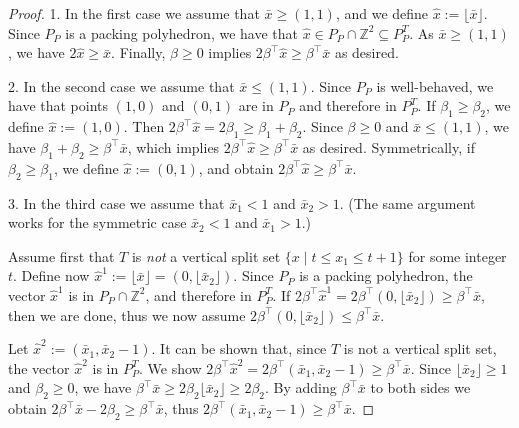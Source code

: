 \documentclass[11pt]{article}
\newcommand{\Z}{\mathbb{Z}}
\newcommand{\floor}[1]{\lfloor#1\rfloor}
\newcommand{\bpar}{\beta}
\newcommand{\cred}{\color{black}}
\begin{document}
\begin{proof}
1. In the first case we assume that $\bar x \ge (1,1)$, and we define $\hat x := \lfloor \bar x \rfloor$.
Since $P_P$ is a packing polyhedron, we have that $\hat x \in P_P \cap \Z^2 \subseteq P_P^T$.
As $\bar x \ge (1,1)$, we have $2 \hat x \ge \bar x$.
Finally, $\bpar \ge 0$ implies $2 \bpar^\top \hat x \ge \bpar^\top \bar x$ as desired.

2. In the second case we assume that $\bar x \le (1,1)$.
Since $P_P$ is well-behaved, we have that points $(1,0)$ and $(0,1)$ are in $P_P$ and therefore in $P_P^T$.
If $\bpar_1 \ge \bpar_2$, we define $\hat x := (1,0)$.
Then $2\bpar^\top \hat x = 2 \bpar_1 \ge \bpar_1 + \bpar_2$.
Since $\bpar \ge 0$ and $\bar x \le (1,1)$, we have $\bpar_1 + \bpar_2 \ge \bpar^\top \bar x$, which implies $2\bpar^\top \hat x \ge \bpar^\top \bar x$ as desired.
Symmetrically, if $\bpar_2 \ge \bpar_1$, we define $\hat x := (0,1)$, and obtain $2\bpar^\top \hat x \ge \bpar^\top \bar x$.

3. In the third case we assume that $\bar x_1 < 1$ and $\bar x_2 > 1$.
(The same argument works for the symmetric case $\bar x_2 < 1$ and $\bar x_1 > 1$.)

Assume first that $T$ is \emph{not} a vertical split set {\cred $\{x \mid t \le x_1 \le t+1\}$} for some integer $t$.
Define now $\hat x^1 := \lfloor \bar x \rfloor = (0,\floor{\bar x_2})$.
Since $P_P$ is {\cred a packing polyhedron}, {\cred the} vector $\hat x^1$ is in $P_P \cap \Z^2$, and therefore in $P_P^T$.
If $2\bpar^\top \hat x^1 = 2 \bpar^\top (0,\floor{\bar x_2}) \ge \bpar^\top \bar x$, then we are done, thus we now assume $2 \bpar^\top (0,\floor{\bar x_2}) \le \bpar^\top \bar x$.

Let $\hat x^2 := (\bar x_1, \bar x_2-1)$.
It can be shown that, since $T$ is not a vertical split set, the vector $\hat x^2$ is in $P_P^T$.
We show 
$2 \bpar^\top \hat x^2 = 2\bpar^\top (\bar x_1,\bar x_2 -1) \ge \bpar^\top \bar x$.
Since $\floor{\bar x_2} \ge 1$ and $\bpar_2 \ge 0$, we have 
$\bpar^\top \bar x \ge 2 \bpar_2 \floor{\bar x_2} \ge 2 \bpar_2$.
By adding $\bpar^\top \bar x$ to both sides we obtain
$2 \bpar^\top \bar x - 2 \bpar_2 \ge \bpar^\top \bar x$,
thus
$2\bpar^\top (\bar x_1,\bar x_2 -1) \ge \bpar^\top \bar x$.


\end{proof}
\end{document}
